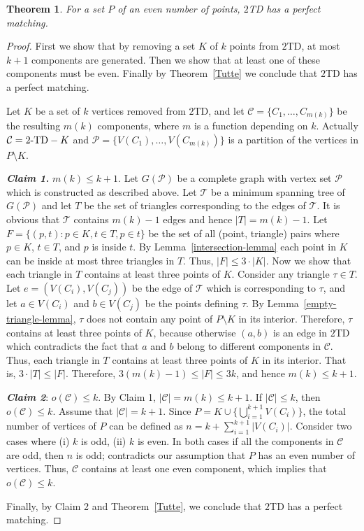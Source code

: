 \documentclass[11pt,a4paper]{article}
\newcommand{\kTD}[2]{$#1$\text{-}TD#2}
\newtheorem{theorem}{Theorem}
\begin{document}
\begin{theorem}
 \label{mt-thr}
For a set $P$ of an even number of points, \kTD{2}{} has a perfect matching.
\end{theorem}
\begin{proof}
First we show that by removing a set $K$ of $k$ points from \kTD{2}{}, at most $k+1$ components are generated. Then we show that at least one of these components must be even. Finally by Theorem~\ref{Tutte} we conclude that \kTD{2}{} has a perfect matching.

Let $K$ be a set of $k$ vertices removed from \kTD{2}{}, and let $\mathcal{C}=\{C_1, \dots, C_{m(k)}\}$ be the resulting $m(k)$ components, where $m$ is a function depending on $k$. Actually $\mathcal{C}=\text{\kTD{2}{}}-K$ and $\mathcal{P}=\{V(C_1),\dots, V(C_{m(k)})\}$ is a partition of the vertices in $P\setminus K$. 

{\bf\em  Claim 1.} $m(k)\le k+1$. Let $G(\mathcal{P})$ be a complete graph with vertex set $\mathcal{P}$ which is constructed as described above. Let $\mathcal{T}$ be a minimum spanning tree of $G(\mathcal{P})$ and let $T$ be the set of triangles corresponding to the edges of $\mathcal{T}$. It is obvious that $\mathcal{T}$ contains $m(k)-1$ edges and hence $|T|=m(k)-1$. Let $F=\{(p,t):p\in K, t\in T, p\in t\}$ be the set of all (point, triangle) pairs where $p\in K$, $t\in T$, and $p$ is inside $t$. By Lemma~\ref{intersection-lemma} each point in $K$ can be inside at most three triangles in $T$. Thus, $|F|\le 3\cdot|K|$.
Now we show that each triangle in $T$ contains at least three points of $K$.  
Consider any triangle $\tau\in T$. Let $e=(V(C_i),V(C_j))$ be the edge of $\mathcal{T}$ which is corresponding to $\tau$, and let $a\in V(C_i)$ and $b\in V(C_j)$ be the points defining $\tau$. By Lemma~\ref{empty-triangle-lemma}, $\tau$ does not contain any point of $P\setminus K$ in its interior. Therefore, $\tau$ contains at least three points of $K$, because otherwise $(a,b)$ is an edge in \kTD{2}{} which contradicts the fact that $a$ and $b$ belong to different components in $\mathcal{C}$. Thus, each triangle in $T$ contains at least three points of $K$ in its interior. That is, $3\cdot|T|\le|F|$. Therefore, $3(m(k)-1)\le |F|\le 3k$, and hence $m(k)\le k+1$.

{\bf \em Claim 2}: $o(\mathcal{C})\le k$. By Claim 1, $|\mathcal{C}|=m(k)\le k+1$. If $|\mathcal{C}|\le k$, then $o(\mathcal{C})\le k$. Assume that $|\mathcal{C}|=k+1$. Since $P=K\cup \{\bigcup^{k+1}_{i=1}{V(C_i)}\}$, the total number of vertices of $P$ can be defined as $n=k+\sum_{i=1}^{k+1}{|V(C_i)|}$. Consider two cases where (i) $k$ is odd, (ii) $k$ is even. In both cases if all the components in $\mathcal{C}$ are odd, then $n$ is odd; contradicts our assumption that $P$ has an even number of vertices. Thus, $\mathcal{C}$ contains at least one even component, which implies that $o(\mathcal{C})\le k$.

Finally, by Claim 2 and Theorem~\ref{Tutte}, we conclude that \kTD{2}{} has a perfect matching.
\end{proof}
\end{document}
